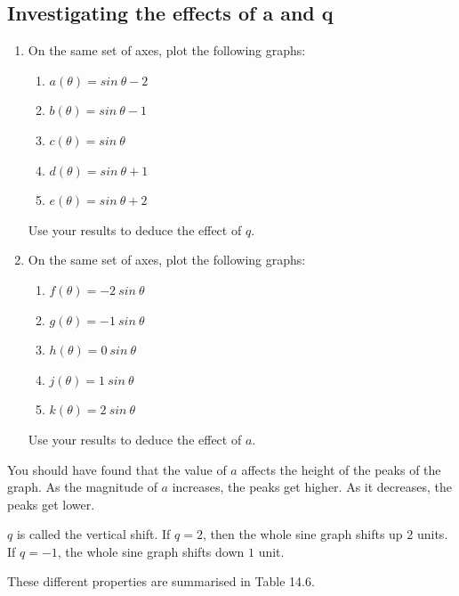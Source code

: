 \subsection*{Investigating the effects of a and q}
\nopagebreak
\begin{enumerate}[noitemsep, label=\textbf{\arabic*}. ] 
\item On the same set of axes, plot the following graphs:
\begin{enumerate}[noitemsep, label=\textbf{\alph*}. ] 
\item $a(\theta )=sin~\theta -2$
\item $b(\theta )=sin~\theta -1$
\item $c(\theta )=sin~\theta $
\item $d(\theta )=sin~\theta +1$
\item $e(\theta )=sin~\theta +2$
\end{enumerate}
Use your results to deduce the effect of $q$.
\item On the same set of axes, plot the following graphs:
\begin{enumerate}[noitemsep, label=\textbf{\alph*}. ] 
\item $f(\theta )=-2~sin~\theta $
\item $g(\theta )=-1~sin~\theta $
\item $h(\theta )=0~sin~\theta $
\item $j(\theta )=1~sin~\theta $
\item $k(\theta )=2~sin~\theta $\end{enumerate}
Use your results to deduce the effect of $a$.
\end{enumerate}
You should have found that the value of $a$ affects the height of the peaks of the graph. As the magnitude of $a$ increases, the peaks get higher. As it decreases, the peaks get lower.\par 
$q$ is called the vertical shift. If $q=2$, then the whole sine graph shifts up $2$ units. If $q=-1$, the whole sine graph shifts down $1$ unit.\par 
These different properties are summarised in Table 14.6.\par 
